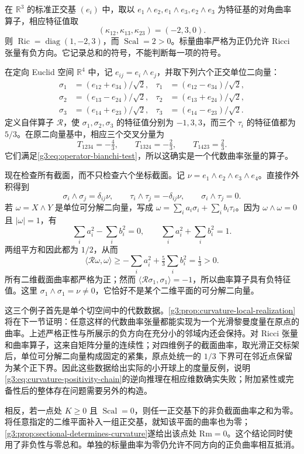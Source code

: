 \begin{example}
	\label{g3:exm:scalar-positive-ricci-negative}
	在 \(\mathbb R^3\) 的标准正交基 \((e_i)\) 中，取以 \(e_1\wedge e_2,e_1\wedge e_3,e_2\wedge e_3\) 为特征基的对角曲率算子，相应特征值取
	\[
		(\kappa_{12},\kappa_{13},\kappa_{23})=(-2,3,0).
	\]
	则 \(\operatorname{Ric}=\operatorname{diag}(1,-2,3)\)，而 \(\operatorname{Scal}=2>0\)。标量曲率严格为正仍允许 Ricci 张量有负方向。它记录总和的符号，不能判断每一项的符号。
\end{example}

\begin{example}
	\label{g3:exm:sectional-positive-operator-negative}
	在定向 Euclid 空间 \(\mathbb R^4\) 中，记 \(e_{ij}=e_i\wedge e_j\)，并取下列六个正交单位二向量：
	\[
		\begin{aligned}
			\sigma_1&=(e_{12}+e_{34})/\sqrt2,&
			\tau_1&=(e_{12}-e_{34})/\sqrt2,\\
			\sigma_2&=(e_{13}-e_{24})/\sqrt2,&
			\tau_2&=(e_{13}+e_{24})/\sqrt2,\\
			\sigma_3&=(e_{14}+e_{23})/\sqrt2,&
			\tau_3&=(e_{14}-e_{23})/\sqrt2.
		\end{aligned}
	\]
	定义自伴算子 \(\mathcal R\)，使 \(\sigma_1,\sigma_2,\sigma_3\) 的特征值分别为 \(-1,3,3\)，而三个 \(\tau_i\) 的特征值都为 \(5/3\)。在原二向量基中，相应三个交叉分量为
	\[
		T_{1234}=-\tfrac43,\qquad
		T_{1324}=-\tfrac23,\qquad
		T_{1423}=\tfrac23.
	\]
	它们满足\eqref{g3:eq:operator-bianchi-test}，所以这确实是一个代数曲率张量的算子。

	现在检查所有截面，而不只检查六个坐标截面。记 \(\nu=e_1\wedge e_2\wedge e_3\wedge e_4\)。直接作外积得到
	\[
		\sigma_i\wedge\sigma_j=\delta_{ij}\nu,\qquad
		\tau_i\wedge\tau_j=-\delta_{ij}\nu,\qquad
		\sigma_i\wedge\tau_j=0.
	\]
	若 \(\omega=X\wedge Y\) 是单位可分解二向量，写成 \(\omega=\sum_i a_i\sigma_i+\sum_i b_i\tau_i\)。因为 \(\omega\wedge\omega=0\) 且 \(|\omega|=1\)，有
	\[
		\sum_i a_i^2-\sum_i b_i^2=0,\qquad
		\sum_i a_i^2+\sum_i b_i^2=1.
	\]
	两组平方和因此都为 \(1/2\)，从而
	\[
		\langle\mathcal R\omega,\omega\rangle
		\geq-\sum_i a_i^2+\tfrac53\sum_i b_i^2
		=\tfrac13>0.
	\]
	所有二维截面曲率都严格为正；然而 \(\langle\mathcal R\sigma_1,\sigma_1\rangle=-1\)，所以曲率算子具有负特征值。这里 \(\sigma_1\wedge\sigma_1=\nu\ne0\)，它恰好不是某个二维平面的可分解二向量。
\end{example}

这三个例子首先是单个切空间中的代数数据。\cref{g3:prop:curvature-local-realization}将在下一节证明：任意这样的代数曲率张量都能实现为一个光滑黎曼度量在原点的曲率。上述严格正性与所展示的负方向在充分小的邻域内还会保持。对 Ricci 张量和曲率算子，这来自矩阵分量的连续性；对四维例子的截面曲率，取光滑正交标架后，单位可分解二向量构成固定的紧集，原点处统一的 \(1/3\) 下界可在邻近点保留为某个正下界。因此这些数据给出实际的小开球上的度量反例，说明\eqref{g3:eq:curvature-positivity-chain}的逆向推理在相应维数确实失败；附加紧性或完备性后的整体存在问题需要另外的构造。

\ProseParagraphBreak

相反，若一点处 \(K\geq0\) 且 \(\operatorname{Scal}=0\)，则任一正交基下的非负截面曲率之和为零。将任意指定的二维平面补入一组正交基，就知该平面的曲率也为零；\cref{g3:prop:sectional-determines-curvature}遂给出该点处 \(\mathrm{Rm}=0\)。这个结论同时使用了非负性与零总和。单独的标量曲率为零仍允许不同方向的正负曲率相互抵消。


